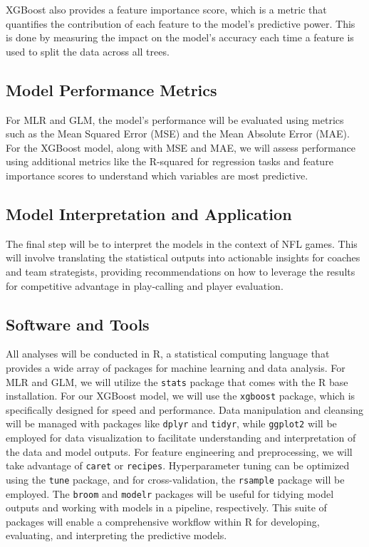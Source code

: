 \documentclass[
  super,
  preprint,
  3p]{elsarticle}
\begin{document}
XGBoost also provides a feature importance score, which is a metric that
quantifies the contribution of each feature to the model's predictive
power. This is done by measuring the impact on the model's accuracy each
time a feature is used to split the data across all trees.

\hypertarget{model-performance-metrics}{%
\subsection{Model Performance Metrics}\label{model-performance-metrics}}

For MLR and GLM, the model's performance will be evaluated using metrics
such as the Mean Squared Error (MSE) and the Mean Absolute Error (MAE).
For the XGBoost model, along with MSE and MAE, we will assess
performance using additional metrics like the R-squared for regression
tasks and feature importance scores to understand which variables are
most predictive.

\hypertarget{model-interpretation-and-application}{%
\subsection{Model Interpretation and
Application}\label{model-interpretation-and-application}}

The final step will be to interpret the models in the context of NFL
games. This will involve translating the statistical outputs into
actionable insights for coaches and team strategists, providing
recommendations on how to leverage the results for competitive advantage
in play-calling and player evaluation.

\hypertarget{software-and-tools}{%
\subsection{Software and Tools}\label{software-and-tools}}

All analyses will be conducted in R, a statistical computing language
that provides a wide array of packages for machine learning and data
analysis. For MLR and GLM, we will utilize the \texttt{stats} package
that comes with the R base installation. For our XGBoost model, we will
use the \texttt{xgboost} package, which is specifically designed for
speed and performance. Data manipulation and cleansing will be managed
with packages like \texttt{dplyr} and \texttt{tidyr}, while
\texttt{ggplot2} will be employed for data visualization to facilitate
understanding and interpretation of the data and model outputs. For
feature engineering and preprocessing, we will take advantage of
\texttt{caret} or \texttt{recipes}. Hyperparameter tuning can be
optimized using the \texttt{tune} package, and for cross-validation, the
\texttt{rsample} package will be employed. The \texttt{broom} and
\texttt{modelr} packages will be useful for tidying model outputs and
working with models in a pipeline, respectively. This suite of packages
will enable a comprehensive workflow within R for developing,
evaluating, and interpreting the predictive models.
\end{document}
